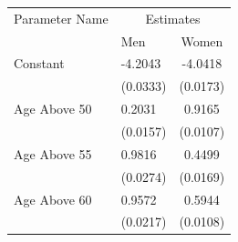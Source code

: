 \begin{tabular}{llc}
    \toprule
     Parameter Name  & \multicolumn{2}{c}{Estimates} \\
     {}              & {Men} &{Women}   \\
    \midrule
    Constant & -4.2043 & -4.0418 \\
    {} & (0.0333) & (0.0173) \\
    Age Above 50 & 0.2031 & 0.9165 \\
    {} & (0.0157) & (0.0107) \\
    Age Above 55 & 0.9816 & 0.4499 \\
    {} & (0.0274) & (0.0169) \\
    Age Above 60 & 0.9572 & 0.5944 \\
    {} & (0.0217) & (0.0108) \\
    \bottomrule
\end{tabular}
